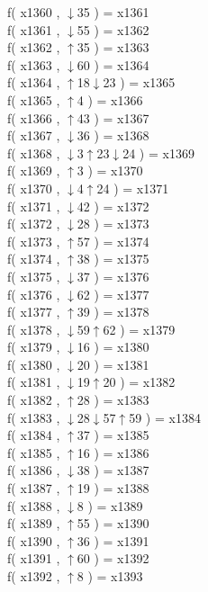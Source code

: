 f( x1360 , $\downarrow$35 ) = x1361 \\
f( x1361 , $\downarrow$55 ) = x1362 \\
f( x1362 , $\uparrow$35 ) = x1363 \\
f( x1363 , $\downarrow$60 ) = x1364 \\
f( x1364 , $\uparrow$18$\downarrow$23 ) = x1365 \\
f( x1365 , $\uparrow$4 ) = x1366 \\
f( x1366 , $\uparrow$43 ) = x1367 \\
f( x1367 , $\downarrow$36 ) = x1368 \\
f( x1368 , $\downarrow$3$\uparrow$23$\downarrow$24 ) = x1369 \\
f( x1369 , $\uparrow$3 ) = x1370 \\
f( x1370 , $\downarrow$4$\uparrow$24 ) = x1371 \\
f( x1371 , $\downarrow$42 ) = x1372 \\
f( x1372 , $\downarrow$28 ) = x1373 \\
f( x1373 , $\uparrow$57 ) = x1374 \\
f( x1374 , $\uparrow$38 ) = x1375 \\
f( x1375 , $\downarrow$37 ) = x1376 \\
f( x1376 , $\downarrow$62 ) = x1377 \\
f( x1377 , $\uparrow$39 ) = x1378 \\
f( x1378 , $\downarrow$59$\uparrow$62 ) = x1379 \\
f( x1379 , $\downarrow$16 ) = x1380 \\
f( x1380 , $\downarrow$20 ) = x1381 \\
f( x1381 , $\downarrow$19$\uparrow$20 ) = x1382 \\
f( x1382 , $\uparrow$28 ) = x1383 \\
f( x1383 , $\downarrow$28$\downarrow$57$\uparrow$59 ) = x1384 \\
f( x1384 , $\uparrow$37 ) = x1385 \\
f( x1385 , $\uparrow$16 ) = x1386 \\
f( x1386 , $\downarrow$38 ) = x1387 \\
f( x1387 , $\uparrow$19 ) = x1388 \\
f( x1388 , $\downarrow$8 ) = x1389 \\
f( x1389 , $\uparrow$55 ) = x1390 \\
f( x1390 , $\uparrow$36 ) = x1391 \\
f( x1391 , $\uparrow$60 ) = x1392 \\
f( x1392 , $\uparrow$8 ) = x1393 \\
